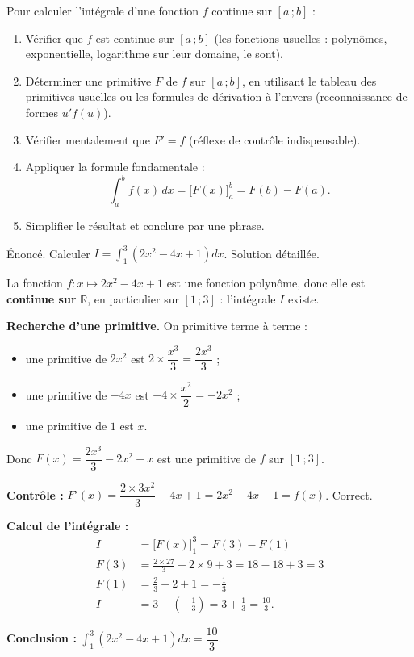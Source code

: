 \documentclass[11pt]{article}
\newcommand{\cle}[1]{{\popxbold\color{popdark}#1}}
\begin{document}
\begin{methode}
Pour calculer l'intégrale d'une fonction $f$ \cle{continue} sur $[a\,;b]$ :
\begin{enumerate}
\item Vérifier que $f$ est continue sur $[a\,;b]$ (les fonctions usuelles : polynômes, exponentielle, logarithme sur leur domaine, le sont).
\item Déterminer une \cle{primitive} $F$ de $f$ sur $[a\,;b]$, en utilisant le tableau des primitives usuelles ou les formules de dérivation à l'envers (reconnaissance de formes $u'f(u)$).
\item Vérifier mentalement que $F' = f$ (réflexe de contrôle indispensable).
\item Appliquer la formule fondamentale :
\[ \int_a^b f(x)\,dx = \big[F(x)\big]_a^b = F(b) - F(a). \]
\item Simplifier le résultat et conclure par une phrase.
\end{enumerate}
\end{methode}

\begin{exoresolu}
Énoncé. Calculer $I = \displaystyle\int_1^3 \left(2x^2 - 4x + 1\right) dx$.
\tcblower
Solution détaillée.

La fonction $f : x \mapsto 2x^2 - 4x + 1$ est une fonction polynôme, donc elle est \textbf{continue sur} $\mathbb{R}$, en particulier sur $[1\,;3]$ : l'intégrale $I$ existe.

\textbf{Recherche d'une primitive.} On primitive terme à terme :
\begin{itemize}
\item une primitive de $2x^2$ est $2\times\dfrac{x^3}{3} = \dfrac{2x^3}{3}$ ;
\item une primitive de $-4x$ est $-4\times\dfrac{x^2}{2} = -2x^2$ ;
\item une primitive de $1$ est $x$.
\end{itemize}
Donc $F(x) = \dfrac{2x^3}{3} - 2x^2 + x$ est une primitive de $f$ sur $[1\,;3]$.

\textbf{Contrôle :} $F'(x) = \dfrac{2\times 3x^2}{3} - 4x + 1 = 2x^2 - 4x + 1 = f(x)$. Correct.

\textbf{Calcul de l'intégrale :}
\begin{align*}
I &= \big[F(x)\big]_1^3 = F(3) - F(1) \\
F(3) &= \frac{2\times 27}{3} - 2\times 9 + 3 = 18 - 18 + 3 = 3 \\
F(1) &= \frac{2}{3} - 2 + 1 = -\frac{1}{3} \\
I &= 3 - \left(-\frac{1}{3}\right) = 3 + \frac{1}{3} = \frac{10}{3}.
\end{align*}

\textbf{Conclusion :} $\displaystyle\int_1^3 \left(2x^2 - 4x + 1\right) dx = \dfrac{10}{3}$.
\end{exoresolu}
\end{document}
